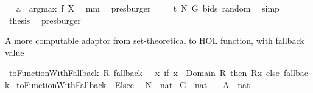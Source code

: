 \begin{isabellebody}
\isamarkupfalse%
\ \isamarkupfalse%
\ {\isachardoublequoteopen}{\isacharbraceleft}{\isacharquery}a{\isacharbraceright}\ {\isacharequal}\ argmax\ {\isacharquery}f\ {\isacharquery}X{\isachardoublequoteclose}\ \isamarkupfalse%
\ mm{}{}\ \isamarkupfalse%
\ presburger\isanewline
{}\isamarkupfalse%
\ \isamarkupfalse%
\ {\isachardoublequoteopen}{\isachardot}{\isachardot}{\isachardot}\ {\isacharequal}\ {\isacharquery}t\ N\ G\ bids\ random{\isachardoublequoteclose}\ \isamarkupfalse%
\ simp\isanewline
{}\isamarkupfalse%
\ \isamarkupfalse%
\ {\isacharquery}thesis\ \isamarkupfalse%
\ presburger\isanewline
{}\isamarkupfalse%
%
\endisatagproof
{\isafoldproof}%
%
\isadelimproof
%
\endisadelimproof
%
\begin{isamarkuptext}%
A more computable adaptor from set-theoretical to HOL function, with fallback value%
\end{isamarkuptext}%
\isamarkuptrue%
\isamarkupfalse%
\ {\isachardoublequoteopen}toFunctionWithFallback{}\ R\ fallback\ {\isacharequal}{\isacharequal}\ {\isacharparenleft}{\isacharpercent}\ x{\isachardot}\ if\ {\isacharparenleft}x\ {\isasymin}\ Domain\ R{\isacharparenright}\ then\ {\isacharparenleft}R{\isacharcomma}{\isacharcomma}x{\isacharparenright}\ else\ fallback{\isacharparenright}{\isachardoublequoteclose}\isanewline
{}\isamarkupfalse%
\ toFunctionWithFallback{}\ {\isacharparenleft}\ {\isachardoublequoteopen}Elsee{\isachardoublequoteclose}\ {}{}{\isacharparenright}%
\isamarkuptrue%
\isamarkupfalse%
\ {\isachardoublequoteopen}N{}{}\ {\isacharequal}{\isacharequal}\ {\isacharbraceleft}{}{\isacharcomma}{}{\isacharcolon}{\isacharcolon}nat{\isacharbraceright}{\isachardoublequoteclose}\isanewline
{}\isamarkupfalse%
\ {\isachardoublequoteopen}G{}{}\ {\isacharequal}{\isacharequal}\ {\isacharbrackleft}{}{}{\isacharcolon}{\isacharcolon}nat{\isacharcomma}\ {}{}{\isacharcomma}\ {}{}{\isacharbrackright}{\isachardoublequoteclose}\isanewline
{}\isamarkupfalse%
\ {\isachardoublequoteopen}A{}{}\ {\isacharequal}{\isacharequal}\ {\isacharbraceleft}{\isacharparenleft}{}{\isacharcomma}{\isacharbraceleft}{}{}{\isacharcomma}{}{}{\isacharcolon}{\isacharcolon}nat{\isacharbraceright}{\isacharparenright}{\isacharcomma}\ {\isacharparenleft}{}{\isacharcomma}{\isacharbraceleft}{}{}{\isacharcomma}{}{}{\isacharbraceright}{\isacharparenright}{\isacharbraceright}{\isachardoublequoteclose}\isanewline

\end{isabellebody}
